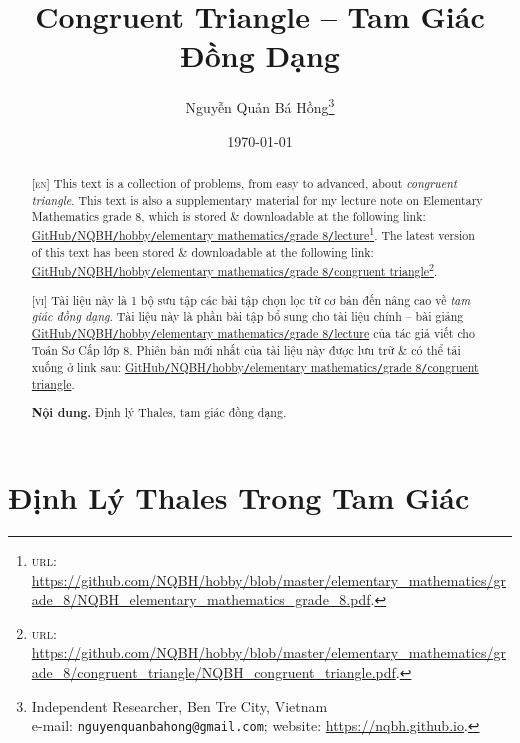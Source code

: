 \documentclass{article}
\title{Congruent Triangle -- Tam Giác Đồng Dạng}
\author{Nguyễn Quản Bá Hồng\footnote{Independent Researcher, Ben Tre City, Vietnam\\e-mail: \texttt{nguyenquanbahong@gmail.com}; website: \url{https://nqbh.github.io}.}}
\date{\today}
\begin{document}
\maketitle
\begin{abstract}
	\textsc{[en]} This text is a collection of problems, from easy to advanced, about \textit{congruent triangle}. This text is also a supplementary material for my lecture note on Elementary Mathematics grade 8, which is stored \& downloadable at the following link: \href{https://github.com/NQBH/hobby/blob/master/elementary_mathematics/grade_8/NQBH_elementary_mathematics_grade_8.pdf}{GitHub\texttt{/}NQBH\texttt{/}hobby\texttt{/}elementary mathematics\texttt{/}grade 8\texttt{/}lecture}\footnote{\textsc{url}: \url{https://github.com/NQBH/hobby/blob/master/elementary_mathematics/grade_8/NQBH_elementary_mathematics_grade_8.pdf}.}. The latest version of this text has been stored \& downloadable at the following link: \href{https://github.com/NQBH/hobby/blob/master/elementary_mathematics/grade_8/congruent_triangle/NQBH_congruent_triangle.pdf}{GitHub\texttt{/}NQBH\texttt{/}hobby\texttt{/}elementary mathematics\texttt{/}grade 8\texttt{/}congruent triangle}\footnote{\textsc{url}: \url{https://github.com/NQBH/hobby/blob/master/elementary_mathematics/grade_8/congruent_triangle/NQBH_congruent_triangle.pdf}.}.
	\vspace{2mm}
	
	\textsc{[vi]} Tài liệu này là 1 bộ sưu tập các bài tập chọn lọc từ cơ bản đến nâng cao về \textit{tam giác đồng dạng}. Tài liệu này là phần bài tập bổ sung cho tài liệu chính -- bài giảng \href{https://github.com/NQBH/hobby/blob/master/elementary_mathematics/grade_8/NQBH_elementary_mathematics_grade_8.pdf}{GitHub\texttt{/}NQBH\texttt{/}hobby\texttt{/}elementary mathematics\texttt{/}grade 8\texttt{/}lecture} của tác giả viết cho Toán Sơ Cấp lớp 8. Phiên bản mới nhất của tài liệu này được lưu trữ \& có thể tải xuống ở link sau: \href{https://github.com/NQBH/hobby/blob/master/elementary_mathematics/grade_8/congruent_triangle/NQBH_congruent_triangle.pdf}{GitHub\texttt{/}NQBH\texttt{/}hobby\texttt{/}elementary mathematics\texttt{/}grade 8\texttt{/}congruent triangle}.
	
	\textsf{\textbf{Nội dung.} Định lý Thales, tam giác đồng dạng.}
\end{abstract}
\tableofcontents
\newpage


\section{Định Lý Thales Trong Tam Giác}
\end{document}
